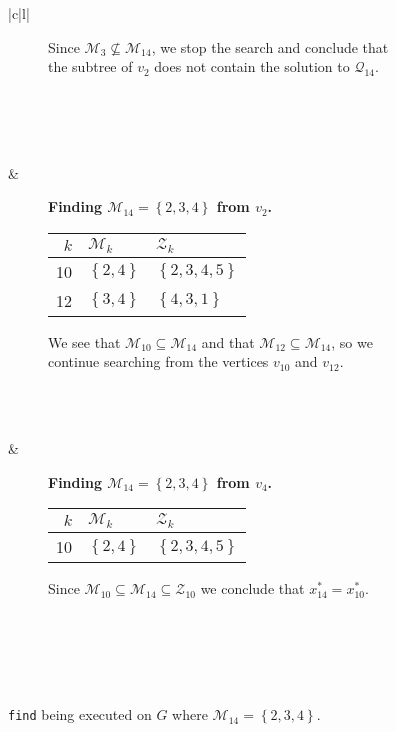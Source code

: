 \begin{figure*}[ht!]
\begin{tabular}[t]{|c|l|}
\begin{subfigure}[b]{0.64\textwidth}
        Since $\mathcal{M}_3 \not \subseteq \mathcal{M}_{14}$, we stop the
        search and conclude that the subtree of $v_2$ does not contain
        the solution to $\mathcal{Q}_{14}$.
        \\ \\ \\
    \end{subfigure}
    \\ \hline
    \begin{subfigure}[b]{0.35\textwidth}
        \centering
        
    \end{subfigure}
    & 
    \begin{subfigure}[b]{0.64\textwidth}
        \textbf{Finding $\mathcal{M}_{14} = \left\{{2,3,4}\right\}$ from $v_2$.} \\
        \begin{tabular}{rll}
            $k$ & $\mathcal{M}_k$            & $\mathcal{Z}_k$ \\ \hline
            10  & $\left\{{2,4}\right\}$   & $\left\{{2,3,4,5}\right\}$ \\ 
            12  & $\left\{{3,4}\right\}$   & $\left\{{4,3,1}\right\}$
        \end{tabular}

        We see that $\mathcal{M}_{10} \subseteq \mathcal{M}_{14}$ and that
        $\mathcal{M}_{12} \subseteq \mathcal{M}_{14}$, so we continue
        searching from the vertices $v_{10}$ and $v_{12}$. 
        \\ \\
    \end{subfigure}
    \\ \hline
    \begin{subfigure}[b]{0.35\textwidth}
        \centering
        
    \end{subfigure}
    & 
    \begin{subfigure}[b]{0.64\textwidth}
        \textbf{Finding $\mathcal{M}_{14} = \left\{{2,3,4}\right\}$ from $v_4$.} \\
        \begin{tabular}{rll}
            $k$ & $\mathcal{M}_k$            & $\mathcal{Z}_k$ \\ \hline
            10  & $\left\{{2,4}\right\}$   & $\left\{{2,3,4,5}\right\}$ \\ 
        \end{tabular}

        Since $\mathcal{M}_{10} \subseteq \mathcal{M}_{14} \subseteq
        \mathcal{Z}_{10}$ we conclude that $x_{14}^* = x_{10}^*$.
        \\ \\ \\ \\
    \end{subfigure}
    \\ \hline
    \end{tabular}
    \caption{\texttt{find} being executed on $G$ where
             $\mathcal{M}_{14} = \left\{{2,3,4}\right\}$.}
    \label{fig:find}
\end{figure*}
